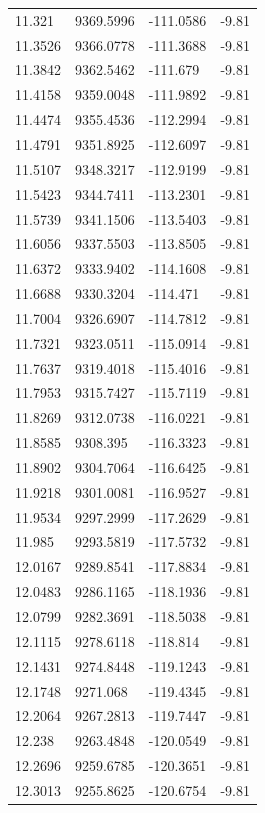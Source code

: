 \begin{table}[H]
\begin{tabular}{llll}
11.321 & 9369.5996 & -111.0586 & -9.81 \\
11.3526 & 9366.0778 & -111.3688 & -9.81 \\
11.3842 & 9362.5462 & -111.679 & -9.81 \\
11.4158 & 9359.0048 & -111.9892 & -9.81 \\
11.4474 & 9355.4536 & -112.2994 & -9.81 \\
11.4791 & 9351.8925 & -112.6097 & -9.81 \\
11.5107 & 9348.3217 & -112.9199 & -9.81 \\
11.5423 & 9344.7411 & -113.2301 & -9.81 \\
11.5739 & 9341.1506 & -113.5403 & -9.81 \\
11.6056 & 9337.5503 & -113.8505 & -9.81 \\
11.6372 & 9333.9402 & -114.1608 & -9.81 \\
11.6688 & 9330.3204 & -114.471 & -9.81 \\
11.7004 & 9326.6907 & -114.7812 & -9.81 \\
11.7321 & 9323.0511 & -115.0914 & -9.81 \\
11.7637 & 9319.4018 & -115.4016 & -9.81 \\
11.7953 & 9315.7427 & -115.7119 & -9.81 \\
11.8269 & 9312.0738 & -116.0221 & -9.81 \\
11.8585 & 9308.395 & -116.3323 & -9.81 \\
11.8902 & 9304.7064 & -116.6425 & -9.81 \\
11.9218 & 9301.0081 & -116.9527 & -9.81 \\
11.9534 & 9297.2999 & -117.2629 & -9.81 \\
11.985 & 9293.5819 & -117.5732 & -9.81 \\
12.0167 & 9289.8541 & -117.8834 & -9.81 \\
12.0483 & 9286.1165 & -118.1936 & -9.81 \\
12.0799 & 9282.3691 & -118.5038 & -9.81 \\
12.1115 & 9278.6118 & -118.814 & -9.81 \\
12.1431 & 9274.8448 & -119.1243 & -9.81 \\
12.1748 & 9271.068 & -119.4345 & -9.81 \\
12.2064 & 9267.2813 & -119.7447 & -9.81 \\
12.238 & 9263.4848 & -120.0549 & -9.81 \\
12.2696 & 9259.6785 & -120.3651 & -9.81 \\
12.3013 & 9255.8625 & -120.6754 & -9.81 \\

\end{tabular}
\end{table}
